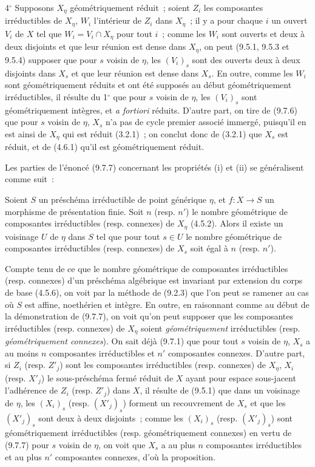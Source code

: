 4$^\circ$ Supposons $X_\eta$ géométriquement réduit~; soient $Z_i$ les
composantes irréductibles de $X_\eta$, $W_i$ l'intérieur de $Z_i$ dans
$X_\eta$~; il y a pour chaque $i$ un ouvert $V_i$ de $X$ tel que
$W_i=V_i\cap X_\eta$ pour tout $i$~; comme les $W_i$ sont ouverts et deux à deux
disjoints et que leur réunion est dense dans $X_\eta$, on peut (9.5.1, 9.5.3 et
9.5.4) supposer que pour $s$ voisin de $\eta$, les $(V_i)_s$ sont des ouverts
deux à deux disjoints dans $X_s$ et que leur réunion est dense dans $X_s$. En
outre, comme les $W_i$ sont géométriquement réduits et ont été supposés au
début géométriquement irréductibles, il résulte du 1$^\circ$ que pour $s$ voisin
de $\eta$, les $(V_i)_s$ sont géométriquement intègres, et \emph{a fortiori}
réduits. D'autre part, on tire de (9.7.6) que pour $s$ voisin de $\eta$, $X_s$
n'a pas de cycle premier associé immergé, puisqu'il en est ainsi de $X_\eta$
qui est réduit (3.2.1)~; on conclut donc de (3.2.1) que $X_s$ est réduit, et de
(4.6.1) qu'il est géométriquement réduit.


Les parties de l'énoncé (9.7.7) concernant les propriétés (i) et (ii) se
généralisent comme suit~:

\begin{proposition}[9.7.8]
\label{IV.9.7.8-fr}
Soient $S$ un préschéma irréductible de point générique $\eta$, et $f:X\to S$
un morphisme de présentation finie. Soit $n$ (resp. $n'$) le nombre géométrique
de composantes irréductibles (resp. connexes) de $X_\eta$ (4.5.2). Alors il
existe un voisinage $U$ de $\eta$ dans $S$ tel que pour tout $s\in U$ le nombre
géométrique de composantes irréductibles (resp. connexes) de $X_s$ soit égal à
$n$ (resp. $n'$).
\end{proposition}

Compte tenu de ce que le nombre géométrique de composantes irréductibles (resp.
connexes) d'un préschéma algébrique est invariant par extension du corps de
base (4.5.6), on voit par la méthode de (9.2.3) que l'on peut se ramener au cas
où $S$ est affine, noethérien et intègre. En outre, en raisonnant comme au début
de la démonstration de (9.7.7), on voit qu'on peut supposer que les composantes
irréductibles (resp. connexes) de $X_\eta$ soient \emph{géométriquement}
irréductibles (resp. \emph{géométriquement connexes}). On sait déjà (9.7.1) que
pour tout $s$ voisin de $\eta$, $X_s$ a au moins $n$ composantes irréductibles
et $n'$ composantes connexes. D'autre part, si $Z_i$ (resp. $Z'_j$) sont les
composantes irréductibles (resp. connexes) de $X_\eta$, $X_i$ (resp. $X'_j$) le
sous-préschéma fermé réduit de $X$ ayant pour espace sous-jacent l'adhérence de
$Z_i$ (resp. $Z'_j$) dans $X$, il résulte de (9.5.1) que dans un voisinage de
$\eta$, les $(X_i)_s$ (resp. $(X'_j)_s$) forment un recouvrement de $X_s$ et que
les $(X'_j)_s$ sont deux à deux disjoints~; comme les $(X_i)_s$ (resp.
$(X'_j)_s$) sont géométriquement irréductibles (resp. géométriquement connexes)
en vertu de (9.7.7) pour $s$ voisin de $\eta$, on voit que $X_s$ a au plus $n$
composantes irréductibles et au plus $n'$ composantes connexes, d'où la
proposition.

